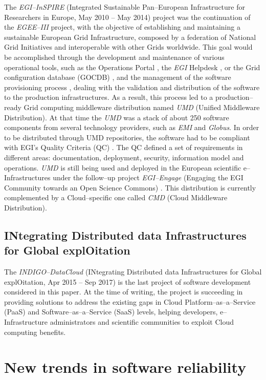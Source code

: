 \documentclass[journal]{IEEEtran}
\begin{document}
The {\sl EGI--InSPIRE} (Integrated Sustainable Pan--European Infrastructure for
Researchers in Europe, May 2010 -- May 2014) project \cite{cordis:egi-inspire}
was the continuation of the {\sl EGEE--III} project, with the objective of establishing and
maintaining a sustainable European Grid Infrastructure, composed by a federation of National
Grid Initiatives and interoperable with other Grids worldwide.
This goal would be accomplished through the
development and maintenance of various operational tools, such as the Operations Portal \cite{egi-ops},
the {\sl EGI} Helpdesk \cite{ggus}, or the Grid configuration database (GOCDB) \cite{gocdb}, and the
management of the software provisioning process \cite{mario}, dealing with the validation and distribution of the software to
the production infrastructures. As a result, this process led to a production--ready
Grid computing middleware distribution named {\sl UMD} (Unified Middleware Distribution). At that time the {\sl UMD}
was a stack of about 250 software components from several technology providers, such
as {\sl EMI} and {\sl Globus}. In order to be distributed through UMD
repositories, the software had to be compliant with EGI's Quality Criteria (QC) \cite{egi-qc}. The
QC defined a set of requirements in different areas: documentation, deployment, security, information
model and operations.
{\sl UMD} is still being used and
deployed in the European scientific e--Infrastructures under the follow--up
project {\sl EGI--Engage} (Engaging the EGI Community towards an Open Science
Commons) \cite{cordis:egi-engage}. This distribution is currently complemented
by a Cloud--specific one called {\sl CMD} (Cloud Middleware Distribution).

\subsection{INtegrating Distributed data Infrastructures for Global
explOitation}

The {\sl INDIGO--DataCloud} (INtegrating Distributed data Infrastructures for Global
explOitation, Apr 2015 -- Sep 2017) \cite{cordis:indigo} is the last
project of software development considered in this paper. At the time of writing,
the project is succeeding in providing solutions to address the existing gaps in
Cloud Platform--as--a--Service (PaaS) and Software--as--a--Service (SaaS) levels,
helping developers, e--Infrastructure administrators and scientific communities to exploit
Cloud computing benefits.

\section{New trends in software reliability}
\label{sec:ntsr}
\end{document}
